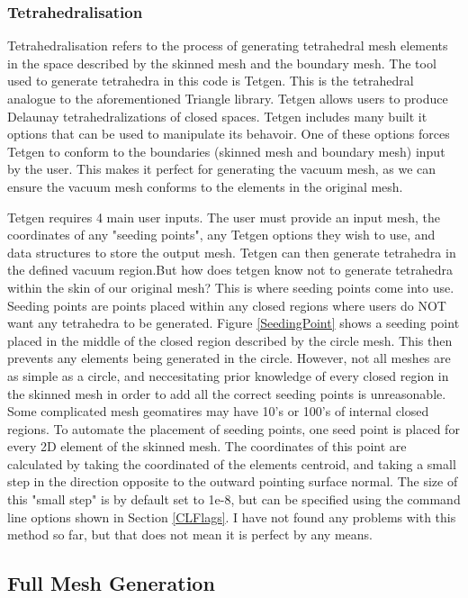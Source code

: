 \documentclass[12pt, letterpaper]{article}
\begin{document}
\subsubsection{Tetrahedralisation}
Tetrahedralisation refers to the process of generating tetrahedral mesh elements in the space described by the skinned mesh and the boundary mesh. The tool used to generate tetrahedra in this code is Tetgen. This is the tetrahedral analogue to the aforementioned Triangle library. Tetgen allows users to produce Delaunay tetrahedralizations of closed spaces. Tetgen includes many built it options that can be used to manipulate its behavoir. One of these options forces Tetgen to conform to the boundaries (skinned mesh and boundary mesh) input by the user. This makes it perfect for generating the vacuum mesh, as we can ensure the vacuum mesh conforms to the elements in the original mesh. 

Tetgen requires 4 main user inputs. The user must provide an input mesh, the coordinates of any "seeding points", any Tetgen options they wish to use, and data structures to store the output mesh. Tetgen can then generate tetrahedra in the defined vacuum region.But how does tetgen know not to generate tetrahedra within the skin of our original mesh? This is where seeding points come into use. Seeding points are points placed within any closed regions where users do NOT want any tetrahedra to be generated. Figure \ref{SeedingPoint} shows a seeding point placed in the middle of the closed region described by the circle mesh. This then prevents any elements being generated in the circle. However, not all meshes are as simple as a circle, and neccesitating prior knowledge of every closed region in the skinned mesh in order to add all the correct seeding points is unreasonable. Some complicated mesh geomatires may have 10's or 100's of internal closed regions. To automate the placement of seeding points, one seed point is placed for every 2D element of the skinned mesh. The coordinates of this point are calculated by taking the coordinated of the elements centroid, and taking a small step in the direction opposite to the outward pointing surface normal. The size of this "small step" is by default set to 1e-8, but can be specified using the command line options shown in Section \ref{CLFlags}. I have not found any problems with this method so far, but that does not mean it is perfect by any means. 

\subsection{Full Mesh Generation}
\end{document}
